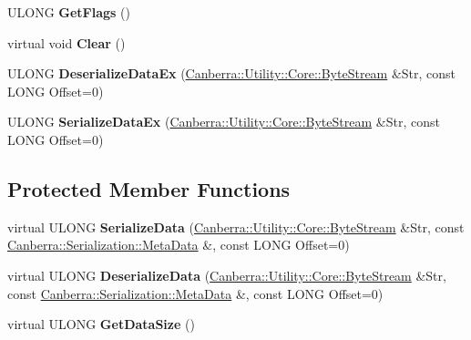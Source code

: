 \begin{DoxyCompactItemize}
U\+L\+O\+NG {\bfseries Get\+Flags} ()
\item 
\mbox{\label{class_canberra_1_1_data_types_1_1_spectroscopy_1_1_list_data_base_aa605687878b5d4f7d69e22b83ddbd7dc}} 
virtual void {\bfseries Clear} ()
\item 
\mbox{\label{class_canberra_1_1_data_types_1_1_spectroscopy_1_1_list_data_base_a480bdbba961f1d9fda3ea550d0c09149}} 
U\+L\+O\+NG {\bfseries Deserialize\+Data\+Ex} (\hyperlink{class_canberra_1_1_utility_1_1_core_1_1_byte_stream}{Canberra\+::\+Utility\+::\+Core\+::\+Byte\+Stream} \&Str, const L\+O\+NG Offset=0)
\item 
\mbox{\label{class_canberra_1_1_data_types_1_1_spectroscopy_1_1_list_data_base_af7f0230384856a30ca09c6703dc0ce08}} 
U\+L\+O\+NG {\bfseries Serialize\+Data\+Ex} (\hyperlink{class_canberra_1_1_utility_1_1_core_1_1_byte_stream}{Canberra\+::\+Utility\+::\+Core\+::\+Byte\+Stream} \&Str, const L\+O\+NG Offset=0)
\end{DoxyCompactItemize}
\subsection*{Protected Member Functions}
\begin{DoxyCompactItemize}
\item 
\mbox{\label{class_canberra_1_1_data_types_1_1_spectroscopy_1_1_list_data_base_a1a50423cd263595ee3dc779d872b23ce}} 
virtual U\+L\+O\+NG {\bfseries Serialize\+Data} (\hyperlink{class_canberra_1_1_utility_1_1_core_1_1_byte_stream}{Canberra\+::\+Utility\+::\+Core\+::\+Byte\+Stream} \&Str, const \hyperlink{class_canberra_1_1_serialization_1_1_meta_data}{Canberra\+::\+Serialization\+::\+Meta\+Data} \&, const L\+O\+NG Offset=0)
\item 
\mbox{\label{class_canberra_1_1_data_types_1_1_spectroscopy_1_1_list_data_base_ae6173547a023e3d1bcaf1ac606fad554}} 
virtual U\+L\+O\+NG {\bfseries Deserialize\+Data} (\hyperlink{class_canberra_1_1_utility_1_1_core_1_1_byte_stream}{Canberra\+::\+Utility\+::\+Core\+::\+Byte\+Stream} \&Str, const \hyperlink{class_canberra_1_1_serialization_1_1_meta_data}{Canberra\+::\+Serialization\+::\+Meta\+Data} \&, const L\+O\+NG Offset=0)
\item 
\mbox{\label{class_canberra_1_1_data_types_1_1_spectroscopy_1_1_list_data_base_a83e1966791f4e7b70dd0052d37dd0f14}} 
virtual U\+L\+O\+NG {\bfseries Get\+Data\+Size} ()
\end{DoxyCompactItemize}
